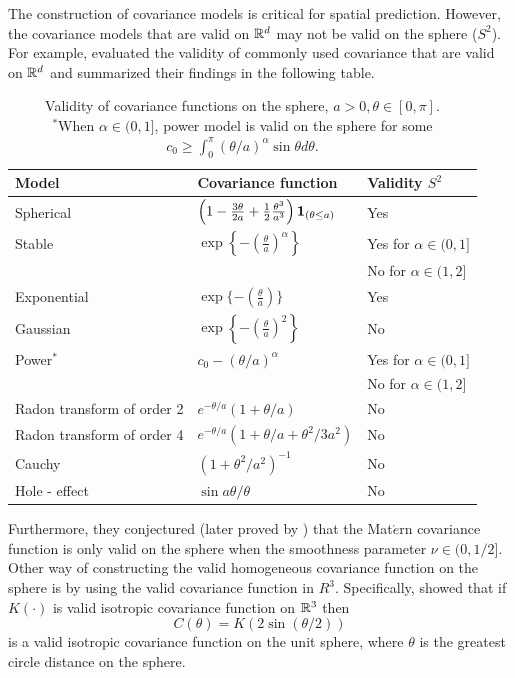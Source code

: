 The construction of covariance models is critical for spatial prediction. However, the covariance models that are valid on $\mathbb{R}^d$ may not be valid on the sphere ($S^2$). For example, \cite{HuangZhangRobeson2011} evaluated the validity of commonly used covariance that are valid on $\mathbb{R}^d$ and summarized their findings in the following table.

	\begin{table}[H]
		\label{valid_cov_models}
		\centering
		\begin{tabular}[htb]{lll} \hline \hline
			Model & Covariance function & Validity  $S^2$           \\   \hline Spherical  &
			$\left(1-\frac{3\theta}{2a} + \frac{1}{2}
			\frac{\theta^3}{a^3}\right){\bf 1}_{(\theta \le a)}$ & Yes   \\
			[2ex]
			Stable     & $\exp\left\{-\left(\frac{\theta}{a}\right)^\alpha\right\}$ & Yes for $\alpha \in (0,1]$  \\
			      &                     & No for $\alpha \in (1,2]$ \\ [2ex] \hspace{0.2in} Exponential &
			$\exp \{-\left(\frac{\theta}{a}\right) \}$ & Yes \\ [2ex]
			\hspace{0.2in} Gaussian & $\exp\left\{-\left(\frac{\theta}{a} \right)^2
			\right\}$  & No \\ [2ex]
			Power$^*$   & $c_0 - (\theta/a)^\alpha$ & Yes for  $\alpha \in (0,1] $  \\
			& & No for $\alpha \in (1,2]$ \\ [2ex]
			Radon transform of order 2         & $e^{-\theta/a}(1+\theta/a)$ &
			No        \\ [2ex] Radon transform of order 4         &
			$e^{-\theta/a} (1+\theta/a+\theta^2/3a^2)$  & No  \\ [2ex] Cauchy &
			$(1+\theta^2/a^2)^{-1}$ &  No      \\ [2ex] Hole - effect & $\sin
			a\theta / \theta$ & No    \\ \hline \hline
		\end{tabular}
		\caption{Validity of covariance functions on the sphere, $a >
			0,\theta \in [0,\pi]$. \\ $^*$When $\alpha \in (0,1]$, power model is
				valid on the sphere  for some $c_0 \ge \int_0^\pi
				(\theta/a)^{\alpha} \sin \theta d \theta$.} \label{tab:t1}				
		\end{table}
			
Furthermore, they conjectured (later proved by \cite{Gneiting2013}) that the Mat$\acute{e}$rn covariance function is only valid on the sphere when the smoothness parameter $\nu\in(0,1/2]$. Other way of constructing the valid homogeneous covariance function on the sphere is by using the valid covariance function in $R^3$. Specifically, \cite{Yadrenko1983} showed that if $K(\cdot)$ is valid isotropic covariance function on $\mathbb{R}^3$ then
		\[
			C(\theta) = K(2\sin(\theta/2))
		\]
is a valid isotropic covariance function on the unit sphere, where $\theta$ is the greatest circle distance on the sphere.\\
			
